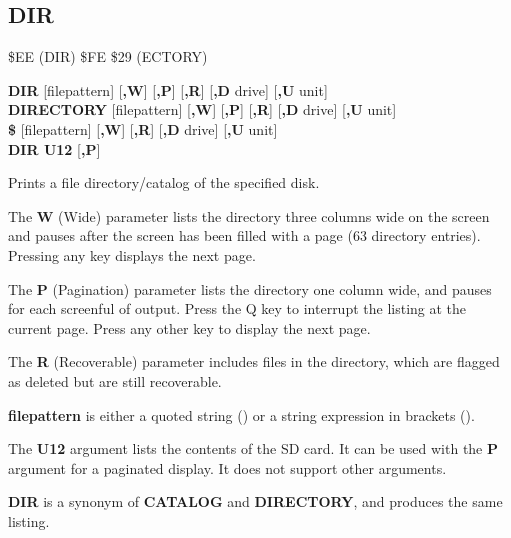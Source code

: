 
\newpage
\subsection{DIR}
\begin{description}[leftmargin=2cm,style=nextline]
\item [Token:]    \$EE (DIR) \$FE \$29 (ECTORY)

\item [Format:]   {\bf DIR} [filepattern] [{\bf,W}] [{\bf,P}] [{\bf,R}] [{\bf,D} drive] [{\bf,U} unit] \\
		            {\bf DIRECTORY} [filepattern] [{\bf,W}] [{\bf,P}] [{\bf,R}] [{\bf,D} drive] [{\bf,U} unit] \\
		            {\bf \$} [filepattern] [{\bf,W}] [{\bf,R}] [{\bf,D} drive] [{\bf,U} unit] \\
                  {\bf DIR U12} [{\bf,P}]

\item [Usage:]    Prints a file directory/catalog of the specified disk.

                  The {\bf W} (Wide) parameter lists the directory three columns wide on the screen and pauses after the screen has been filled with a page (63 directory entries). Pressing any key displays the next page.

                  The {\bf P} (Pagination) parameter lists the directory one column wide, and pauses for each screenful of output. Press the Q key to interrupt the listing at the current page. Press any other key to display the next page.

                  The {\bf R} (Recoverable) parameter includes files in the directory, which are flagged as deleted but are still recoverable.

                  {\bf filepattern} is either a quoted string () or a string expression in brackets ().

                  The {\bf U12} argument lists the contents of the SD card. It can be used with the {\bf P} argument for a paginated display. It does not support other arguments.

                  \drivedefinition

                  \unitdefinition

\item [Remarks:]  {\bf DIR} is a synonym of {\bf CATALOG} and {\bf DIRECTORY}, and produces the same listing.


\end{description}
